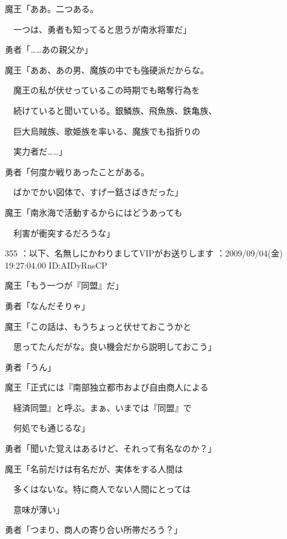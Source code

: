 \documentclass[a4j,twocolumn]{tarticle}
\begin{document}
魔王「ああ。二つある。\par{} 
　一つは、勇者も知ってると思うが南氷将軍だ」\par{} 
勇者「……あの親父か」 



魔王「ああ、あの男、魔族の中でも強硬派だからな。\par{} 
　魔王の私が伏せっているこの時期でも略奪行為を\par{} 
　続けていると聞いている。銀鱗族、飛魚族、鉄亀族、\par{} 
　巨大烏賊族、歌姫族を率いる、魔族でも指折りの\par{} 
　実力者だ……」 



勇者「何度か戦りあったことがある。\par{} 
　ばかでかい図体で、すげー銛さばきだった」 



魔王「南氷海で活動するからにはどうあっても\par{} 
　利害が衝突するだろうな」 

	
    
    

355 ：以下、名無しにかわりましてVIPがお送りします ：2009/09/04(金) 19:27:04.00 ID:AIDyRnsCP 


魔王「もう一つが『同盟』だ」\par{} 
勇者「なんだそりゃ」 



魔王「この話は、もうちょっと伏せておこうかと\par{} 
　思ってたんだがな。良い機会だから説明しておこう」 



勇者「うん」 



魔王「正式には『南部独立都市および自由商人による\par{} 
　経済同盟』と呼ぶ。まぁ、いまでは『同盟』で\par{} 
　何処でも通じるな」\par{} 
勇者「聞いた覚えはあるけど、それって有名なのか？」 



魔王「名前だけは有名だが、実体をする人間は\par{} 
　多くはないな。特に商人でない人間にとっては\par{} 
　意味が薄い」 



勇者「つまり、商人の寄り合い所帯だろう？」 
\end{document}
